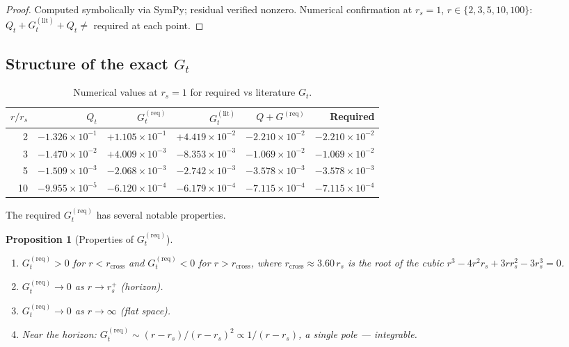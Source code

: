 \documentclass[11pt,a4paper]{article}
\theoremstyle{plain}
\newtheorem{proposition}[theorem]{Proposition}
\theoremstyle{definition}
\theoremstyle{remark}
\newcommand{\rs}{r_s}
\begin{document}
\begin{proof}
Computed symbolically via SymPy; residual verified nonzero.
Numerical confirmation at $\rs = 1$, $r \in \{2,3,5,10,100\}$:
$Q_t + G_t^{(\mathrm{lit})} + Q_t \ne$ required at each point.
\end{proof}

\subsection{Structure of the exact $G_t$}

\begin{table}[h]
\centering
\caption{Numerical values at $\rs = 1$ for required vs literature $G_t$.}
\label{tab:Gt}
\begin{tabular}{rrrrrr}
\toprule
$r/\rs$ & $Q_t$ & $G_t^{(\mathrm{req})}$ & $G_t^{(\mathrm{lit})}$ & $Q+G^{(\mathrm{req})}$ & Required \\
\midrule
2  & $-1.326\times10^{-1}$ & $+1.105\times10^{-1}$ & $+4.419\times10^{-2}$ & $-2.210\times10^{-2}$ & $-2.210\times10^{-2}$ \\
3  & $-1.470\times10^{-2}$ & $+4.009\times10^{-3}$ & $-8.353\times10^{-3}$ & $-1.069\times10^{-2}$ & $-1.069\times10^{-2}$ \\
5  & $-1.509\times10^{-3}$ & $-2.068\times10^{-3}$ & $-2.742\times10^{-3}$ & $-3.578\times10^{-3}$ & $-3.578\times10^{-3}$ \\
10 & $-9.955\times10^{-5}$ & $-6.120\times10^{-4}$ & $-6.179\times10^{-4}$ & $-7.115\times10^{-4}$ & $-7.115\times10^{-4}$ \\
\bottomrule
\end{tabular}
\end{table}

The required $G_t^{(\mathrm{req})}$ has several notable properties.

\begin{proposition}[Properties of $G_t^{(\mathrm{req})}$]\label{prop:Gt_props}
\begin{enumerate}
  \item[\rm(i)] $G_t^{(\mathrm{req})} > 0$ for $r < r_{\mathrm{cross}}$
    and $G_t^{(\mathrm{req})} < 0$ for $r > r_{\mathrm{cross}}$, where
    $r_{\mathrm{cross}} \approx 3.60\,\rs$ is the root of the cubic
    $r^3-4r^2\rs+3r\rs^2-3\rs^3 = 0$.
  \item[\rm(ii)] $G_t^{(\mathrm{req})} \to 0$ as $r \to \rs^+$ (horizon).
  \item[\rm(iii)] $G_t^{(\mathrm{req})} \to 0$ as $r \to \infty$ (flat space).
  \item[\rm(iv)] Near the horizon: $G_t^{(\mathrm{req})} \sim (r-\rs)/(r-\rs)^2
    \propto 1/(r-\rs)$, a single pole --- integrable.
\end{enumerate}
\end{proposition}
\end{document}
